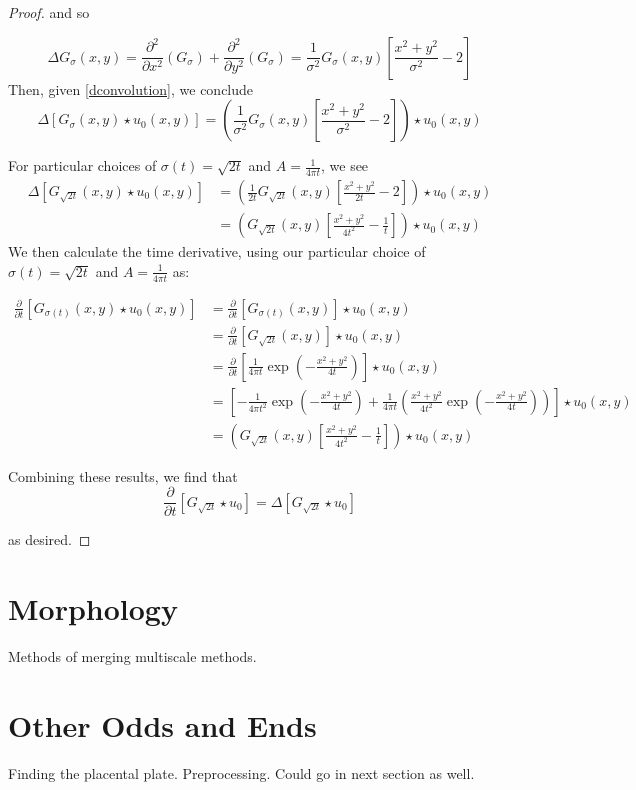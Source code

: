 \begin{proof}
	and so
	
	\begin{equation}
	\Delta G_\sigma(x,y) =
		\frac{\partial^2}{\partial x^2} \left(G_{\sigma}\right)
		+ \frac{\partial^2}{\partial y^2} \left(G_{\sigma}\right)
		= \frac{1}{\sigma^2} G_\sigma(x,y) \left[ \frac{x^2 + y^2}{\sigma^2} - 2\right] 
	\end{equation}
	Then, given \cref{dconvolution}, we conclude
	\begin{equation}
	\Delta \left[ G_\sigma(x,y) \star u_0(x,y) \right] 
	= \left(\frac{1}{\sigma^2} G_\sigma(x,y) \left[ \frac{x^2 + y^2}{\sigma^2} - 2\right]\right) \star u_0(x,y)
	\end{equation}
	
	For particular choices of $\sigma(t) = \sqrt{2t}$ and $A = \frac{1}{4\pi t}$,
	we see 
	\begin{align}
		\Delta \left[ G_{\sqrt{2t}}(x,y) \star u_0(x,y) \right] 
		&= \left(\frac{1}{2t} G_{\sqrt{2t}}(x,y) \left[ \frac{x^2 + y^2}{2t} - 2\right]\right) \star u_0(x,y) \\
		&= \left(G_{\sqrt{2t}}(x,y) \left[ \frac{x^2 + y^2}{4t^2} - \frac{1}{t}\right]\right) \star u_0(x,y)
	\end{align}
	We then calculate the time derivative,
	using our particular choice of $\sigma(t) = \sqrt{2t}$ and $A = \frac{1}{4\pi t}$ as:
	
	\begin{align}
	\frac{\partial}{\partial t} \left[ G_{\sigma(t)}(x,y) \star u_0(x,y) \right]
	&= \frac{\partial}{\partial t} \left[ G_{\sigma(t)}(x,y) \right] \star u_0(x,y) \\
	&= \frac{\partial}{\partial t} \left[ G_{\sqrt{2t}}(x,y)\right] \star u_0(x,y) \\
	&= \frac{\partial}{\partial t} \left[
	\frac{1}{4\pi t} \exp\left(-\frac{x^2 + y^2}{4t}\right) \right] \star u_0(x,y) \\
	&= \left[ -\frac{1}{4\pi t^2} \exp\left(-\frac{x^2 + y^2}{4t}\right) + 
	\frac{1}{4\pi t}\left( \frac{x^2 + y^2}{4t^2} \exp\left(-\frac{x^2 + y^2}{4t}\right)\right)
		\right] \star u_0(x,y) \\
		&= \left(G_{\sqrt{2t}}(x,y) \left[ \frac{x^2 + y^2}{4t^2} -\frac{1}{t}\right]\right) \star u_0(x,y)
	\end{align}

	Combining these results, we find that
	\begin{equation}
	\frac{\partial}{\partial t} \left[ G_{\sqrt{2t}} \star u_0 \right]
	= \Delta \left[ G_{\sqrt{2t}} \star u_0 \right] 
	\end{equation}
	
	as desired. \end{proof}
\hrulefill
\section{Morphology}
	Methods of merging multiscale methods.
	
	
\hrulefill
\section{Other Odds and Ends}
	Finding the placental plate. Preprocessing. Could go in next section as well.



